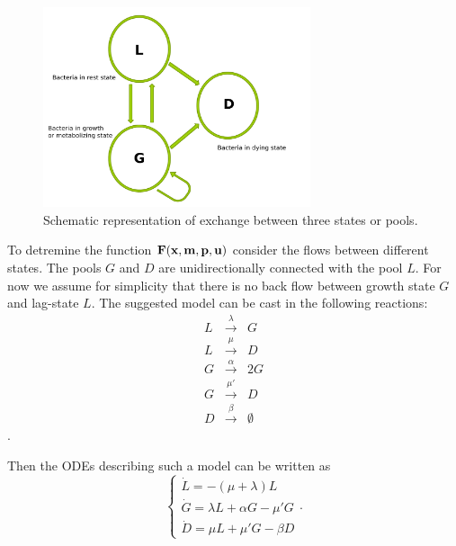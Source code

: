 \documentclass[10pt,A4paper]{article}
\begin{document}
\begin{figure}[t]
    \begin{center}
    \includegraphics[width=0.7\textwidth]{Figures/TPM_fig.pdf}
    \caption{Schematic representation of exchange between three states or pools.}
    \label{SchematicRep}
    \end{center}
    \end{figure}

To detremine the function $\mathbf{F}(\mathbf{x}, \mathbf{m}, \mathbf{p}, \mathbf{u})$ consider the flows between different states.
The pools $G$ and $D$ are unidirectionally connected with the pool $L$. 
For now we assume for simplicity that there is no back flow between growth state $G$ and lag-state $L$. 
The suggested model can be cast in the following reactions:
\begin{eqnarray}
L &\stackrel{\lambda}{\longrightarrow} & G\\
L &\stackrel{\mu}{\longrightarrow} & D\\
G &\stackrel{\alpha}{\longrightarrow} & 2G\\
G &\stackrel{\mu'}{\longrightarrow} & D\\
D &\stackrel{\beta}{\longrightarrow} & \emptyset
\end{eqnarray}.

Then the ODEs describing such a model can be written as 
\begin{equation}
\begin{cases}
    \dot{L} = -(\mu + \lambda) L\\
    \dot{G} = \lambda L + \alpha G - \mu' G\\
    \dot{D} = \mu  L + \mu' G- \beta D  
\end{cases}.
\end{equation}

\end{document}
